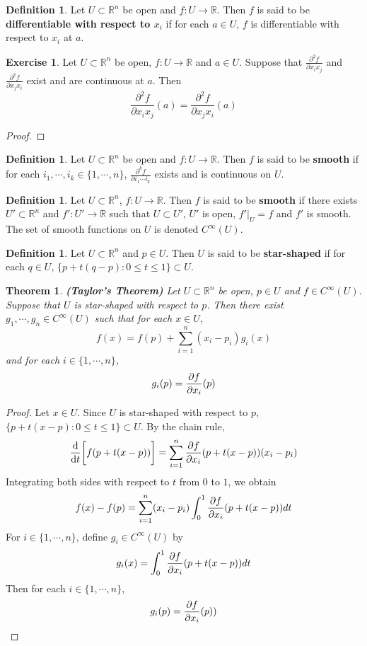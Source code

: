 \documentclass[12pt]{amsart}
\newtheorem{thm}{Theorem}[subsection]
\theoremstyle{definition}
\newtheorem{defn}[definition]{Definition}
\theoremstyle{remark}
\theoremstyle{definition}
\newtheorem{ex}[definition]{Exercise}
\newcommand{\R}{\mathbb{R}}
\begin{document}
	\begin{defn}
		Let $U \subset \R^n$ be open and $f: U \rightarrow \R$. Then $f$ is said to be \textbf{differentiable with respect to $x_i$} if for each $a \in U$, $f$ is differentiable with respect to $x_i$ at $a$.
	\end{defn}

	\begin{ex}
		Let $U \subset \R^n$ be open, $f: U \rightarrow \R$ and $a \in U$. Suppose that $\frac{\partial ^2 f}{\partial x_i x_j}$ and $\frac{\partial ^2 f}{\partial x_j x_i}$ exist and are continuous at $a$. Then $$\frac{\partial ^2 f}{\partial x_i x_j} (a) = \frac{\partial ^2 f}{\partial x_j x_i} (a)$$
	\end{ex}

	\begin{proof}
		
	\end{proof}

	\begin{defn}
		Let $U \subset \R^n$ be open and $f: U \rightarrow \R$. Then $f$ is said to be \textbf{smooth} if for each $i_1, \cdots, i_k \in \{1, \cdots, n\}$, $\frac{\partial^k f}{\partial i_1 \cdots i_k}$ exists and is continuous on $U$.
	\end{defn}

	\begin{defn}
		Let $U \subset \R^n$, $f: U \rightarrow \R$. Then $f$ is said to be \textbf{smooth} if there exists $U' 
		\subset \R^n$ and $f':U' \rightarrow \R$ such that $U \subset U'$, $U'$ is open, $f'|_U = f$ and $f'$ is smooth. The set of smooth functions on $U$ is denoted $C^{\infty}(U)$.
	\end{defn}

	\begin{defn} 
		Let $U \subset \R^n$ and $p \in U$. Then $U$ is said to be \textbf{star-shaped} if for each $q \in U$, $\{p + t(q-p): 0 \leq t \leq 1\} \subset U$.
	\end{defn}

	\begin{thm} \textbf{(Taylor's Theorem)}
		Let $U \subset \R^n$ be open, $p \in U$ and $f \in C^{\infty}(U)$. Suppose that $U$ is star-shaped with respect to $p$. Then there exist $g_1, \cdots, g_n \in C^{\infty}(U)$ such that for each $x \in U$, $$f(x) = f(p) + \sum_{i=1}^n (x_i - p_i) g_i(x)$$ and for each $i \in \{1, \cdots, n\}$, $$g_i(p) = {\pdv{f}{x_i}}(p)$$
	\end{thm}

	\begin{proof}
		Let $x \in U$. Since $U$ is star-shaped with respect to $p$, $\{p + t(x-p): 0 \leq t \leq 1\} \subset U$. By the chain rule, 
		$${\dv{t}} \bigg[ f(p+t(x-p)) \bigg] = \sum_{i=1}^n {\pdv{f}{x_i}}(p+t(x-p)) (x_i - p_i)$$
		Integrating both sides with respect to $t$ from $0$ to $1$, we obtain
		$$f(x) - f(p) = \sum_{i=1}^n (x_i - p_i) \int_{0}^{1}  {\pdv{f}{x_i}}(p+t(x-p)) dt $$
		For $i \in \{1, \cdots, n\}$, define $g_i \in C^{\infty}(U)$ by $$g_i(x) = \int_{0}^{1}  {\pdv{f}{x_i}}(p+t(x-p)) dt$$
		Then for each $i \in \{1, \cdots, n\}$, $$g_i(p) = {\pdv{f}{x_i}}(p))$$
	\end{proof}
\end{document}

